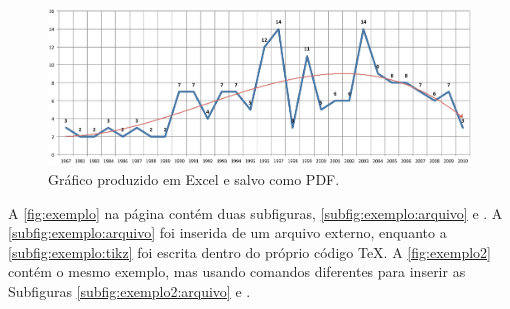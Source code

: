\begin{figure}[htb]
  \caption{Gráfico produzido em Excel e salvo como PDF.}\label{fig:grafico_excel}
  \begin{center}
      \includegraphics[scale=0.5]{img/abntex2-modelo-img-grafico}
  \end{center}
\end{figure}


A \autoref{fig:exemplo} na página \pageref{fig:exemplo} contém duas subfiguras, \autoref{subfig:exemplo:arquivo} e .
  A \autoref{subfig:exemplo:arquivo} foi inserida de um arquivo externo, enquanto a \autoref{subfig:exemplo:tikz} foi escrita dentro do próprio código \TeX.
  A \autoref{fig:exemplo2} contém o mesmo exemplo, mas usando comandos diferentes para inserir as Subfiguras \ref{subfig:exemplo2:arquivo} e .

